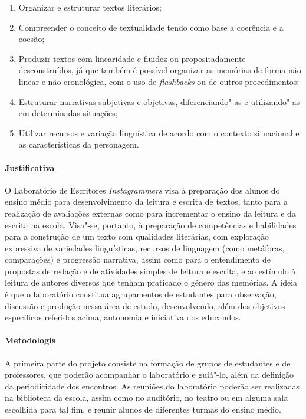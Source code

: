 \documentclass[11pt]{extarticle}
\begin{document}
\begin{enumerate}
\item
Organizar e estruturar textos literários;

\item
Compreender o conceito de textualidade tendo como base a coerência e a
coesão;

\item
Produzir textos com linearidade e fluidez ou propositadamente
desconstruídos, já que também é possível organizar as memórias de forma
não linear e não cronológica, com o uso de \emph{flashbacks} ou de
outros procedimentos;

\item
Estruturar narrativas subjetivas e objetivas, diferenciando"-as e
utilizando"-as em determinadas situações;

\item
Utilizar recursos e variação linguística de acordo com o contexto
situacional e as características da personagem.
\end{enumerate}

\paragraph{Justificativa}
O Laboratório de Escritores \emph{Instagrammers} visa à preparação dos
alunos do ensino médio para desenvolvimento da leitura e escrita de
textos, tanto para a realização de avaliações externas como para
incrementar o ensino da leitura e da escrita na escola. Visa"-se,
portanto, à preparação de competências e habilidades para a construção
de um texto com qualidades literárias, com exploração expressiva de
variedades linguísticas, recursos de linguagem (como metáforas,
comparações) e progressão narrativa, assim como para o entendimento de
propostas de redação e de atividades simples de leitura e escrita, e ao
estímulo à leitura de autores diversos que tenham praticado o gênero das
memórias. A ideia é que o laboratório constitua agrupamentos de
estudantes para observação, discussão e produção nessa área de estudo,
desenvolvendo, além dos objetivos específicos referidos acima, autonomia
e iniciativa dos educandos.

\paragraph{Metodologia}
A primeira parte do projeto consiste na formação de grupos de estudantes
e de professores, que poderão acompanhar o laboratório e guiá"-lo, além
da definição da periodicidade dos encontros. As reuniões do laboratório
poderão ser realizadas na biblioteca da escola, assim como no auditório,
no teatro ou em alguma sala escolhida para tal fim, e reunir alunos de
diferentes turmas do ensino médio.
\end{document}
